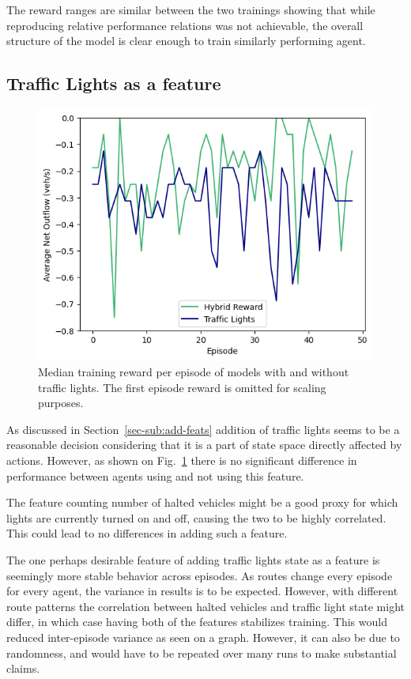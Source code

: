\documentclass{article}
\begin{document}
    The reward ranges are similar between the two trainings showing that while reproducing relative performance relations was not achievable,
    the overall structure of the model is clear enough to train similarly performing agent.

    \subsection{Traffic Lights as a feature}
    \begin{figure}[h]
        \centering
        \includegraphics[width=0.5\linewidth]{figs/traffic_light_result.png}
        \caption{
            Median training reward per episode of models with and without traffic lights.
            The first episode reward is omitted for scaling purposes.
        }
        \label{fig:traffic-light-result}
    \end{figure}
    As discussed in Section~\ref{sec-sub:add-feats} addition of traffic lights seems to be a reasonable decision considering that it is a part of state space directly affected by actions.
    However, as shown on Fig.~\ref{fig:traffic-light-result} there is no significant difference in performance between agents using and not using this feature.

    The feature counting number of halted vehicles might be a good proxy for which lights are currently turned on and off,
    causing the two to be highly correlated. This could lead to no differences in adding such a feature.

    The one perhaps desirable feature of adding traffic lights state as a feature is seemingly more stable behavior across episodes.
    As routes change every episode for every agent, the variance in results is to be expected.
    However, with different route patterns the correlation between halted vehicles and traffic light state might differ, in which case having both of the features stabilizes training.
    This would reduced inter-episode variance as seen on a graph.
    However, it can also be due to randomness, and would have to be repeated over many runs to make substantial claims.
\end{document}
